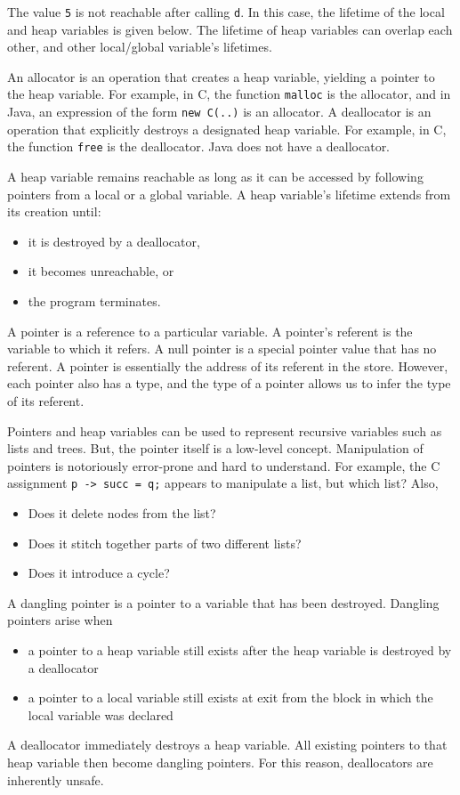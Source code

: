 \documentclass[a4paper, openany]{memoir}
\begin{document}
The value \texttt{5} is not reachable after calling \texttt{d}. In this case, the lifetime of the local and heap variables is given below.
The lifetime of heap variables can overlap each other, and other local/global variable's lifetimes.

An allocator is an operation that creates a heap variable, yielding a pointer to the heap variable. For example, in C, the function \texttt{malloc} is the allocator, and in Java, an expression of the form \texttt{new C(..)} is an allocator. A deallocator is an operation that explicitly destroys a designated heap variable. For example, in C, the function \texttt{free} is the deallocator. Java does not have a deallocator.

A heap variable remains reachable as long as it can be accessed by following pointers from a local or a global variable. A heap variable's lifetime extends from its creation until:
\begin{itemize}
    \item it is destroyed by a deallocator,
    \item it becomes unreachable, or
    \item the program terminates.
\end{itemize}

A pointer is a reference to a particular variable. A pointer's referent is the variable to which it refers. A null pointer is a special pointer value that has no referent. A pointer is essentially the address of its referent in the store. However, each pointer also has a type, and the type of a pointer allows us to infer the type of its referent.

Pointers and heap variables can be used to represent recursive variables such as lists and trees. But, the pointer itself is a low-level concept. Manipulation of pointers is notoriously error-prone and hard to understand. For example, the C assignment \texttt{p -> succ = q;} appears to manipulate a list, but which list? Also,
\begin{itemize}
    \item Does it delete nodes from the list?
    \item Does it stitch together parts of two different lists?
    \item Does it introduce a cycle?
\end{itemize}

A dangling pointer is a pointer to a variable that has been destroyed. Dangling pointers arise when
\begin{itemize}
    \item a pointer to a heap variable still exists after the heap variable is destroyed by a deallocator
    \item a pointer to a local variable still exists at exit from the block in which the local variable was declared
\end{itemize}
A deallocator immediately destroys a heap variable. All existing pointers to that heap variable then become dangling pointers. For this reason, deallocators are inherently unsafe.
\end{document}
